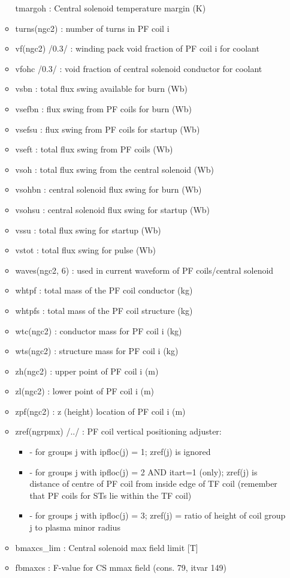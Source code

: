 \documentclass[
]{article}
\providecommand{\tightlist}{%
  \setlength{\itemsep}{0pt}\setlength{\parskip}{0pt}}
\begin{document}
\begin{itemize}
\begin{itemize}
    tmargoh : Central solenoid temperature margin (K)
  \item
    turns(ngc2) : number of turns in PF coil i
  \item
    vf(ngc2) /0.3/ : winding pack void fraction of PF coil i for coolant
  \item
    vfohc /0.3/ : void fraction of central solenoid conductor for
    coolant
  \item
    vsbn : total flux swing available for burn (Wb)
  \item
    vsefbn : flux swing from PF coils for burn (Wb)
  \item
    vsefsu : flux swing from PF coils for startup (Wb)
  \item
    vseft : total flux swing from PF coils (Wb)
  \item
    vsoh : total flux swing from the central solenoid (Wb)
  \item
    vsohbn : central solenoid flux swing for burn (Wb)
  \item
    vsohsu : central solenoid flux swing for startup (Wb)
  \item
    vssu : total flux swing for startup (Wb)
  \item
    vstot : total flux swing for pulse (Wb)
  \item
    waves(ngc2, 6) : used in current waveform of PF coils/central
    solenoid
  \item
    whtpf : total mass of the PF coil conductor (kg)
  \item
    whtpfs : total mass of the PF coil structure (kg)
  \item
    wtc(ngc2) : conductor mass for PF coil i (kg)
  \item
    wts(ngc2) : structure mass for PF coil i (kg)
  \item
    zh(ngc2) : upper point of PF coil i (m)
  \item
    zl(ngc2) : lower point of PF coil i (m)
  \item
    zpf(ngc2) : z (height) location of PF coil i (m)
  \item
    zref(ngrpmx) /../ : PF coil vertical positioning adjuster:

    \begin{itemize}
    \tightlist
    \item
      - for groups j with ipfloc(j) = 1; zref(j) is ignored
    \item
      - for groups j with ipfloc(j) = 2 AND itart=1 (only); zref(j) is
      distance of centre of PF coil from inside edge of TF coil
      (remember that PF coils for STs lie within the TF coil)
    \item
      - for groups j with ipfloc(j) = 3; zref(j) = ratio of height of
      coil group j to plasma minor radius
    \end{itemize}
  \item
    bmaxcs\_lim : Central solenoid max field limit {[}T{]}
  \item
    fbmaxcs : F-value for CS mmax field (cons. 79, itvar 149)
  \end{itemize}


\end{itemize}
\end{document}
